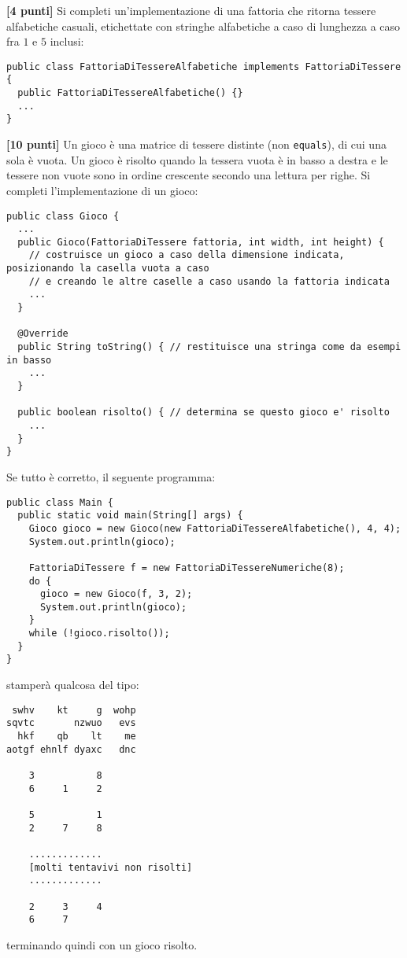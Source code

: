 \documentclass{article}[10pt]
\newcounter{esnu}
\newenvironment{esercizio}{\medskip \noindent {\bf Esercizio\addtocounter{esnu}{1} \arabic{esnu}}}{}
\begin{document}
\begin{esercizio}
\textbf{[4 punti]}
Si completi un'implementazione di una fattoria che ritorna
tessere alfabetiche casuali, etichettate con
stringhe alfabetiche a caso di lunghezza a caso fra $1$ e $5$ inclusi:
%
{\small
\begin{verbatim}
public class FattoriaDiTessereAlfabetiche implements FattoriaDiTessere {
  public FattoriaDiTessereAlfabetiche() {}
  ...
}
\end{verbatim}
}
\end{esercizio}

\begin{esercizio}
\textbf{[10 punti]}
Un gioco \`e una matrice di tessere distinte (non \texttt{equals}), di cui una sola \`e
vuota. Un gioco
\`e risolto quando la tessera vuota \`e in basso a destra e le tessere non vuote
sono in ordine crescente secondo una lettura per righe.
Si completi l'implementazione di un gioco:
%
{\small
\begin{verbatim}
public class Gioco {
  ...
  public Gioco(FattoriaDiTessere fattoria, int width, int height) {
    // costruisce un gioco a caso della dimensione indicata, posizionando la casella vuota a caso
    // e creando le altre caselle a caso usando la fattoria indicata
    ...
  }

  @Override
  public String toString() { // restituisce una stringa come da esempi in basso
    ...
  }

  public boolean risolto() { // determina se questo gioco e' risolto
    ...
  }
}
\end{verbatim}
}

\end{esercizio}

Se tutto \`e corretto, il seguente programma:
%
{\small
\begin{verbatim}
public class Main {
  public static void main(String[] args) {
    Gioco gioco = new Gioco(new FattoriaDiTessereAlfabetiche(), 4, 4);
    System.out.println(gioco);

    FattoriaDiTessere f = new FattoriaDiTessereNumeriche(8);
    do {
      gioco = new Gioco(f, 3, 2);
      System.out.println(gioco);
    }
    while (!gioco.risolto());
  }
}
\end{verbatim}
}

\noindent
stamper\`a qualcosa del tipo:

{\small
\begin{verbatim}
 swhv    kt     g  wohp 
sqvtc       nzwuo   evs 
  hkf    qb    lt    me 
aotgf ehnlf dyaxc   dnc 

    3           8 
    6     1     2 

    5           1 
    2     7     8 

    .............
    [molti tentavivi non risolti]
    .............

    2     3     4 
    6     7       
\end{verbatim}
}

\noindent
terminando quindi con un gioco risolto.
\end{document}
